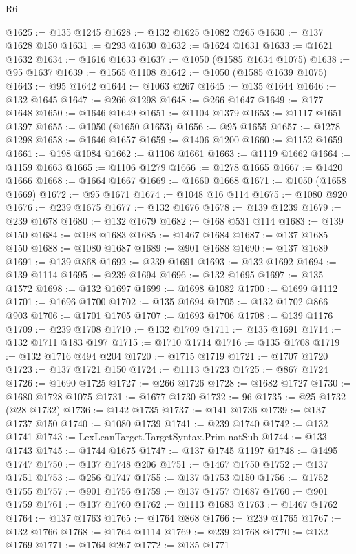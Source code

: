 \begin{lexlean}{R6}
\begin{coremodule}
@1625 := @135 @1245
@1628 := @132 @1625 @1082 @265
@1630 := @137 @1628 @150
@1631 := @293 @1630
@1632 := @1624 @1631
@1633 := @1621 @1632
@1634 := @1616 @1633
@1637 := @1050 (@1585 @1634 @1075)
@1638 := @95 @1637
@1639 := @1565 @1108
@1642 := @1050 (@1585 @1639 @1075)
@1643 := @95 @1642
@1644 := @1063 @267
@1645 := @135 @1644
@1646 := @132 @1645
@1647 := @266 @1298
@1648 := @266 @1647
@1649 := @177 @1648
@1650 := @1646 @1649
@1651 := @1104 @1379
@1653 := @1117 @1651 @1397
@1655 := @1050 (@1650 @1653)
@1656 := @95 @1655
@1657 := @1278 @1298
@1658 := @1646 @1657
@1659 := @1406 @1200
@1660 := @1152 @1659
@1661 := @198 @1084
@1662 := @1106 @1661
@1663 := @1119 @1662
@1664 := @1159 @1663
@1665 := @1106 @1279
@1666 := @1278 @1665
@1667 := @1420 @1666
@1668 := @1664 @1667
@1669 := @1660 @1668
@1671 := @1050 (@1658 @1669)
@1672 := @95 @1671
@1674 := @1048 @16 @114
@1675 := @1080 @920
@1676 := @239 @1675
@1677 := @132 @1676
@1678 := @139 @1239
@1679 := @239 @1678
@1680 := @132 @1679
@1682 := @168 @531 @114
@1683 := @139 @150
@1684 := @198 @1683
@1685 := @1467 @1684
@1687 := @137 @1685 @150
@1688 := @1080 @1687
@1689 := @901 @1688
@1690 := @137 @1689
@1691 := @139 @868
@1692 := @239 @1691
@1693 := @132 @1692
@1694 := @139 @1114
@1695 := @239 @1694
@1696 := @132 @1695
@1697 := @135 @1572
@1698 := @132 @1697
@1699 := @1698 @1082
@1700 := @1699 @1112
@1701 := @1696 @1700
@1702 := @135 @1694
@1705 := @132 @1702 @866 @903
@1706 := @1701 @1705
@1707 := @1693 @1706
@1708 := @139 @1176
@1709 := @239 @1708
@1710 := @132 @1709
@1711 := @135 @1691
@1714 := @132 @1711 @183 @197
@1715 := @1710 @1714
@1716 := @135 @1708
@1719 := @132 @1716 @494 @204
@1720 := @1715 @1719
@1721 := @1707 @1720
@1723 := @137 @1721 @150
@1724 := @1113 @1723
@1725 := @867 @1724
@1726 := @1690 @1725
@1727 := @266 @1726
@1728 := @1682 @1727
@1730 := @1680 @1728 @1075
@1731 := @1677 @1730
@1732 := 96
@1735 := @25 @1732 (@28 @1732)
@1736 := @142 @1735
@1737 := @141 @1736
@1739 := @137 @1737 @150
@1740 := @1080 @1739
@1741 := @239 @1740
@1742 := @132 @1741
@1743 := LexLeanTarget.TargetSyntax.Prim.natSub
@1744 := @133 @1743
@1745 := @1744 @1675
@1747 := @137 @1745 @1197
@1748 := @1495 @1747
@1750 := @137 @1748 @206
@1751 := @1467 @1750
@1752 := @137 @1751
@1753 := @256 @1747
@1755 := @137 @1753 @150
@1756 := @1752 @1755
@1757 := @901 @1756
@1759 := @137 @1757 @1687
@1760 := @901 @1759
@1761 := @137 @1760
@1762 := @1113 @1683
@1763 := @1467 @1762
@1764 := @137 @1763
@1765 := @1764 @868
@1766 := @239 @1765
@1767 := @132 @1766
@1768 := @1764 @1114
@1769 := @239 @1768
@1770 := @132 @1769
@1771 := @1764 @267
@1772 := @135 @1771

\end{coremodule}
\end{lexlean}
